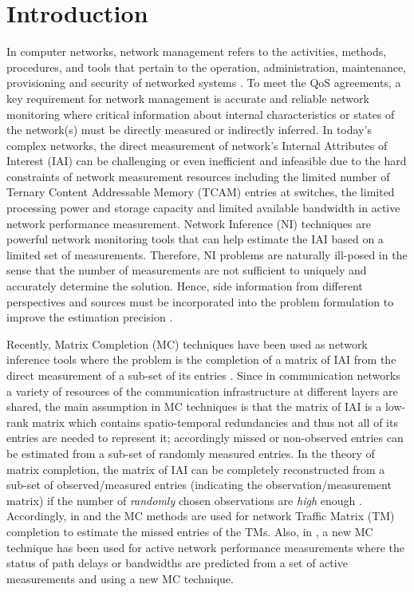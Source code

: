 \section{Introduction}  \label{sec:SNIPERIntro}
In computer networks, network management refers to the activities, methods, procedures, and tools that pertain to the operation, administration, maintenance, provisioning and security of networked systems \cite{Clemmi:2006}. To meet the QoS agreements, a key requirement for network management is accurate and reliable network monitoring where critical information about internal characteristics or states of the network(s) must be directly measured or indirectly inferred. In today's complex networks, the direct measurement of network's Internal Attributes of Interest (IAI) can be challenging or even inefficient and infeasible due to the hard constraints of network measurement resources including the limited number of Ternary Content Addressable Memory (TCAM) entries at switches, the limited processing power and storage capacity and limited available bandwidth in active network performance measurement. Network Inference (NI) techniques are powerful network monitoring tools that can help estimate the IAI based on a limited set of measurements. Therefore, NI problems are naturally ill-posed in the sense that the number of measurements are not sufficient to uniquely and accurately determine the solution. Hence, side information from different perspectives and sources must be incorporated into the problem formulation to improve the estimation precision \cite{QZhao:2006} \cite{MDFE:2013} \cite{HNguyen:2007}. %

Recently, Matrix Completion (MC) techniques have been used as network inference tools where the problem is the completion of a matrix of IAI from the direct measurement of a sub-set of its entries \cite{Roughan:2012}\cite{Gursun:2011}\cite{YLiao:2011}. Since in communication networks a variety of resources of the communication infrastructure at different layers are shared, the main assumption in MC techniques is that the matrix of IAI is a low-rank matrix which contains spatio-temporal redundancies and thus not all of its entries are needed to represent it; accordingly missed or non-observed entries can be estimated from a sub-set of randomly measured entries. In the theory of matrix completion, the matrix of IAI can be completely reconstructed from a sub-set of observed/measured entries (indicating the observation/measurement matrix) if the number of \emph{randomly} chosen observations are \emph{high} enough \cite{Candes:2009}\cite{Candes:2010}. Accordingly, in \cite{Roughan:2012} and \cite{Gursun:2011} the MC methods are used for network Traffic Matrix (TM) completion to estimate the missed entries of the TMs. Also, in \cite{YLiao:2011}, a new MC technique has been used for active network performance measurements where the status of path delays or bandwidths are predicted from a set of active measurements and using a new MC technique.

